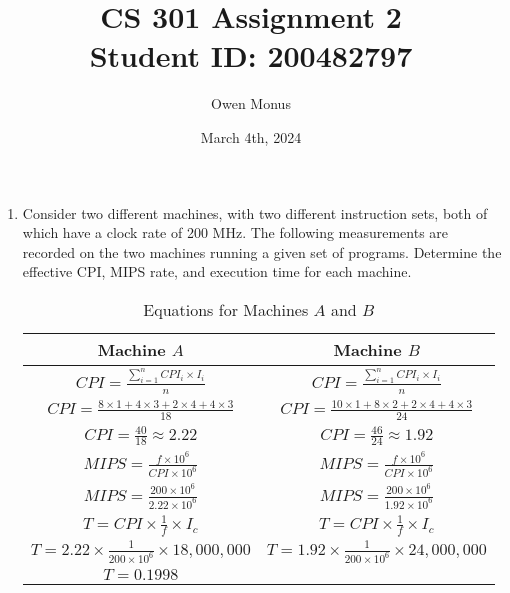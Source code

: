 \documentclass{article}
\begin{document}
\title{CS 301 Assignment 2\\[0.5cm]\large Student ID: 200482797}
\author{Owen Monus}
\date{March 4th, 2024}

\maketitle

\begin{enumerate}
    \item Consider two different machines, with two different instruction sets, both of which have a
    clock rate of 200 MHz. The following measurements are recorded on the two machines running a given
    set of programs. Determine the effective CPI, MIPS rate, and execution time for each machine.
        
    \begin{table}[htbp]
        \centering
        \renewcommand{\arraystretch}{2}
        \caption{Equations for Machines \(A\) and \(B\)}
        \label{tab:equations}
        \begin{tabular}{cc}
            \hline
            Machine \(A\) & Machine \(B\) \\
            \hline
            \( CPI = \frac{\sum_{i=1}^{n}{CPI_i \times I_i}}{{n}} \) & 
            \( CPI = \frac{\sum_{i=1}^{n}{CPI_i \times I_i}}{{n}} \) \\
            \( CPI = \frac{8 \times 1 + 4 \times 3 + 2 \times 4 + 4 \times 3}{18} \) & 
            \( CPI = \frac{10 \times 1 + 8 \times 2 + 2 \times 4 + 4 \times 3}{24} \) \\
            \( CPI = \frac{40}{18} \approx 2.22 \) & \( CPI = \frac{46}{24} \approx 1.92\) \\
            \hline
            \( MIPS = \frac{f \times 10^6}{CPI \times 10^6} \) & 
            \( MIPS = \frac{f \times 10^6}{CPI \times 10^6} \) \\
            \( MIPS = \frac{200 \times 10^6}{2.22 \times 10^6} \) & 
            \( MIPS = \frac{200 \times 10^6}{1.92 \times 10^6} \) \\ %
            \hline
            \( T = CPI \times \frac{1}{f} \times I_c \) & 
            \( T = CPI \times \frac{1}{f} \times I_c \) \\
            \( T = 2.22 \times \frac{1}{200 \times 10^6} \times 18,000,000 \) & 
            \( T = 1.92 \times \frac{1}{200 \times 10^6} \times 24,000,000 \) \\
            \( T = 0.1998\) \\
        \end{tabular}
    \end{table}


\end{enumerate}
\end{document}

